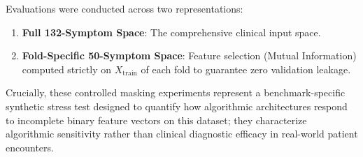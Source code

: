 Evaluations were conducted across two representations:
\begin{enumerate}
    \item \textbf{Full 132-Symptom Space}: The comprehensive clinical input space.
    \item \textbf{Fold-Specific 50-Symptom Space}: Feature selection (Mutual Information) computed strictly on $X_{\text{train}}$ of each fold to guarantee zero validation leakage.
\end{enumerate}

Crucially, these controlled masking experiments represent a benchmark-specific synthetic stress test designed to quantify how algorithmic architectures respond to incomplete binary feature vectors on this dataset; they characterize algorithmic sensitivity rather than clinical diagnostic efficacy in real-world patient encounters.

